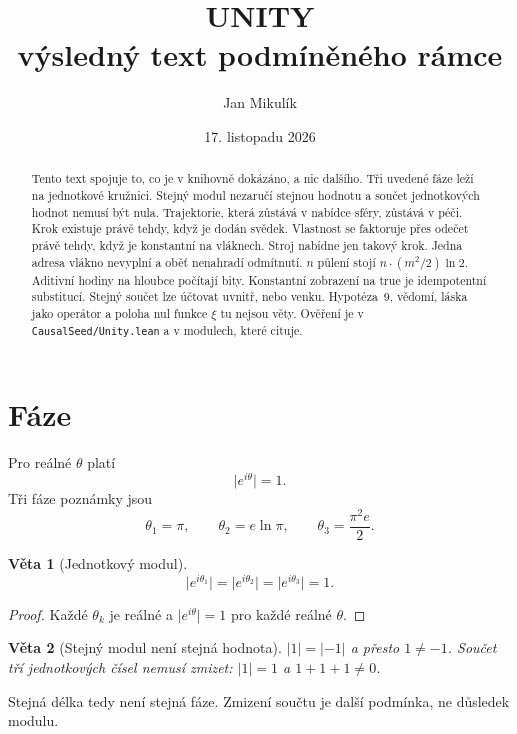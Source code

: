 \documentclass[11pt,a4paper]{article}
\title{\textbf{UNITY}\\[4pt]
\large výsledný text podmíněného rámce}
\author{Jan Mikulík}
\date{17. listopadu 2026}
\newtheorem{theorem}{Věta}
\theoremstyle{definition}
\theoremstyle{remark}
\begin{document}
\maketitle

\begin{abstract}
Tento text spojuje to, co je v knihovně dokázáno, a nic dalšího.
Tři uvedené fáze leží na jednotkové kružnici.
Stejný modul nezaručí stejnou hodnotu a součet jednotkových hodnot nemusí být nula.
Trajektorie, která zůstává v nabídce sféry, zůstává v péči.
Krok existuje právě tehdy, když je dodán svědek.
Vlastnost se faktoruje přes odečet právě tehdy, když je konstantní na vláknech.
Stroj nabídne jen takový krok.
Jedna adresa vlákno nevyplní a oběť nenahradí odmítnutí.
\(n\) půlení stojí \(n\cdot(m^2/2)\ln 2\).
Aditivní hodiny na hloubce počítají bity.
Konstantní zobrazení na \(\mathrm{true}\) je idempotentní substitucí.
Stejný součet lze účtovat uvnitř, nebo venku.
Hypotéza~9, vědomí, láska jako operátor a poloha nul funkce \(\xi\) tu nejsou věty.
Ověření je v \texttt{CausalSeed/Unity.lean} a v modulech, které cituje.
\end{abstract}

\section{Fáze}

Pro reálné \(\theta\) platí
\[
  \bigl\lvert e^{i\theta}\bigr\rvert = 1.
\]
Tři fáze poznámky jsou
\[
  \theta_1=\pi,
  \qquad
  \theta_2=e\ln\pi,
  \qquad
  \theta_3=\frac{\pi^2 e}{2}.
\]

\begin{theorem}[Jednotkový modul]
\[
  \lvert e^{i\theta_1}\rvert
  =
  \lvert e^{i\theta_2}\rvert
  =
  \lvert e^{i\theta_3}\rvert
  =1.
\]
\end{theorem}

\begin{proof}
Každé \(\theta_k\) je reálné a \(\lvert e^{i\theta}\rvert=1\) pro každé reálné \(\theta\).
\end{proof}

\begin{theorem}[Stejný modul není stejná hodnota]
\(\lvert 1\rvert=\lvert -1\rvert\) a přesto \(1\neq -1\).
Součet tří jednotkových čísel nemusí zmizet:
\(\lvert 1\rvert=1\) a \(1+1+1\neq 0\).
\end{theorem}

Stejná délka tedy není stejná fáze.
Zmizení součtu je další podmínka, ne důsledek modulu.
\end{document}
